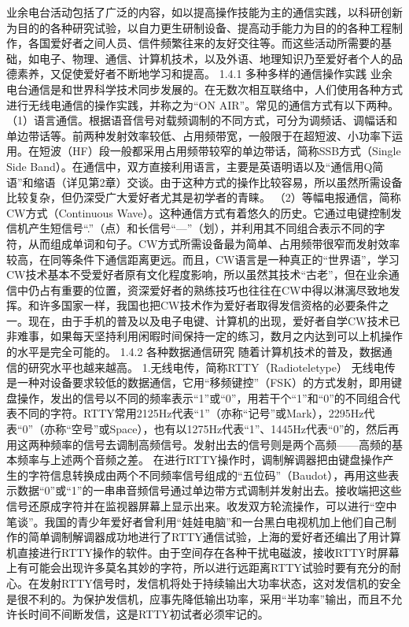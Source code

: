 \documentclass[12pt,UTF8]{ctexbook}
\begin{document}
业余电台活动包括了广泛的内容，如以提高操作技能为主的通信实践，以科研创新为目的的各种研究试验，以自力更生研制设备、提高动手能力为目的的各种工程制作，各国爱好者之间人员、信件频繁往来的友好交往等。而这些活动所需要的基础，如电子、物理、通信、计算机技术，以及外语、地理知识乃至爱好者个人的品德素养，又促使爱好者不断地学习和提高。
1.4.1 多种多样的通信操作实践
业余电台通信是和世界科学技术同步发展的。在无数次相互联络中，人们使用各种方式进行无线电通信的操作实践，并称之为“ON AIR”。常见的通信方式有以下两种。
（1）语言通信。根据语音信号对载频调制的不同方式，可分为调频话、调幅话和单边带话等。前两种发射效率较低、占用频带宽，一般限于在超短波、小功率下运用。在短波（HF）段一般都采用占用频带较窄的单边带话，简称SSB方式（Single Side Band）。在通信中，双方直接利用语言，主要是英语明语以及“通信用Q简语”和缩语（详见第2章）交谈。由于这种方式的操作比较容易，所以虽然所需设备比较复杂，但仍深受广大爱好者尤其是初学者的青睐。
（2）等幅电报通信，简称CW方式（Continuous Wave）。这种通信方式有着悠久的历史。它通过电键控制发信机产生短信号“.”（点）和长信号“—”（划），并利用其不同组合表示不同的字符，从而组成单词和句子。CW方式所需设备最为简单、占用频带很窄而发射效率较高，在同等条件下通信距离更远。而且，CW语言是一种真正的“世界语”，学习CW技术基本不受爱好者原有文化程度影响，所以虽然其技术“古老”，但在业余通信中仍占有重要的位置，资深爱好者的熟练技巧也往往在CW中得以淋漓尽致地发挥。和许多国家一样，我国也把CW技术作为爱好者取得发信资格的必要条件之一。现在，由于手机的普及以及电子电键、计算机的出现，爱好者自学CW技术已非难事，如果每天坚持利用闲暇时间保持一定的练习，数月之内达到可以上机操作的水平是完全可能的。
1.4.2 各种数据通信研究
随着计算机技术的普及，数据通信的研究水平也越来越高。
1.无线电传，简称RTTY（Radioteletype）
无线电传是一种对设备要求较低的数据通信，它用“移频键控”（FSK）的方式发射，即用键盘操作，发出的信号以不同的频率表示“1”或“0”，用若干个“1”和“0”的不同组合代表不同的字符。RTTY常用2125Hz代表“1”（亦称“记号”或Mark），2295Hz代表“0”（亦称“空号”或Space），也有以1275Hz代表“1”、1445Hz代表“0”的，然后再用这两种频率的信号去调制高频信号。发射出去的信号则是两个高频——高频的基本频率与上述两个音频之差。
在进行RTTY操作时，调制解调器把由键盘操作产生的字符信息转换成由两个不同频率信号组成的“五位码”（Baudot），再用这些表示数据“0”或“1”的一串串音频信号通过单边带方式调制并发射出去。接收端把这些信号还原成字符并在监视器屏幕上显示出来。收发双方轮流操作，可以进行“空中笔谈”。我国的青少年爱好者曾利用“娃娃电脑”和一台黑白电视机加上他们自己制作的简单调制解调器成功地进行了RTTY通信试验，上海的爱好者还编出了用计算机直接进行RTTY操作的软件。由于空间存在各种干扰电磁波，接收RTTY时屏幕上有可能会出现许多莫名其妙的字符，所以进行远距离RTTY试验时要有充分的耐心。在发射RTTY信号时，发信机将处于持续输出大功率状态，这对发信机的安全是很不利的。为保护发信机，应事先降低输出功率，采用“半功率”输出，而且不允许长时间不间断发信，这是RTTY初试者必须牢记的。
\end{document}

